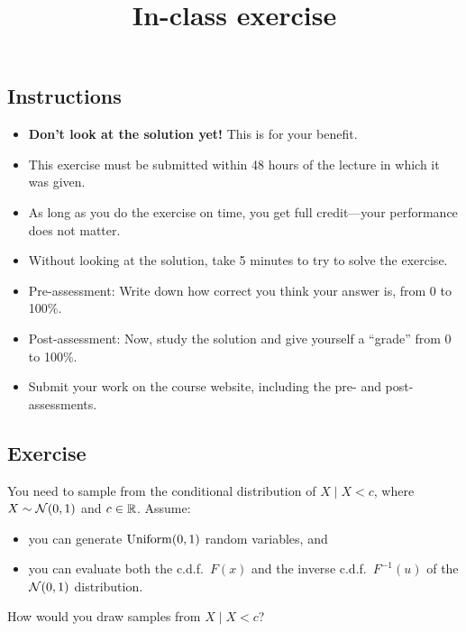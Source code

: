\documentclass[12pt]{article}
\title{In-class exercise}
\author{}
\date{}
\begin{document}
\maketitle

\subsection*{Instructions}
\begin{itemize}
\item \textbf{Don't look at the solution yet!} This is for your benefit.
\item This exercise must be submitted within 48 hours of the lecture in which it was given. 
\item As long as you do the exercise on time, you get full credit---your performance does not matter.
\item Without looking at the solution, take 5 minutes to try to solve the exercise.
\item Pre-assessment: Write down how correct you think your answer is, from 0 to 100\%.
\item Post-assessment: Now, study the solution and give yourself a ``grade'' from 0 to 100\%.
\item Submit your work on the course website, including the pre- and post- assessments.
\end{itemize}

\subsection*{Exercise}
You need to sample from the conditional distribution of $X\mid X<c$, where $X\sim\mathcal{N}(0,1)$ and $c\in \mathbb{R}$. Assume:
\begin{itemize}
    \item you can generate $\operatorname*{Uniform}(0,1)$ random variables, and 
    \item you can evaluate both the c.d.f.\ $F(x)$ and the inverse c.d.f.\ $F^{-1}(u)$ of the $\mathcal{N}(0,1)$ distribution.
\end{itemize}
How would you draw samples from $X\mid X<c$?
\end{document}
